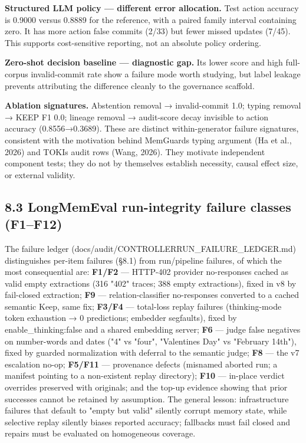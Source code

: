 \textbf{Structured LLM policy --- different error allocation.} Test
action accuracy is 0.9000 versus 0.8889 for the reference, with a paired
family interval containing zero. It has more action false commits (2/33)
but fewer missed updates (7/45). This supports cost-sensitive reporting,
not an absolute policy ordering.

\textbf{Zero-shot decision baseline --- diagnostic gap.} Its lower score
and high full-corpus invalid-commit rate show a failure mode worth
studying, but label leakage prevents attributing the difference cleanly
to the governance scaffold.

\textbf{Ablation signatures.} Abstention removal → invalid-commit 1.0;
typing removal → KEEP F1 0.0; lineage removal → audit-score decay
invisible to action accuracy (0.8556→0.3689). These are distinct
within-generator failure signatures, consistent with the motivation
behind MemGuard\textquotesingle s typing argument (Ha et al., 2026) and
TOKI\textquotesingle s audit rows (Wang, 2026). They motivate
independent component tests; they do not by themselves establish
necessity, causal effect size, or external validity.

\subsection{8.3 LongMemEval run-integrity failure classes
(F1--F12)}\label{longmemeval-run-integrity-failure-classes-f1f12}

The failure ledger (docs/audit/CONTROLLERRUN\_FAILURE\_LEDGER.md)
distinguishes per-item failures (§8.1) from run/pipeline failures, of
which the most consequential are: \textbf{F1/F2} --- HTTP-402 provider
no-responses cached as valid empty extractions (316 "402" traces; 388
empty extractions), fixed in v8 by fail-closed extraction; \textbf{F9}
--- relation-classifier no-responses converted to a cached semantic
Keep, same fix; \textbf{F3/F4} --- total-loss replay failures
(thinking-mode token exhaustion → 0 predictions; embedder segfaults),
fixed by enable\_thinking:false and a shared embedding server;
\textbf{F6} --- judge false negatives on number-words and dates ("4" vs
"four", "Valentine\textquotesingle s Day" vs "February 14th"), fixed by
guarded normalization with deferral to the semantic judge; \textbf{F8}
--- the v7 escalation no-op; \textbf{F5/F11} --- provenance defects
(misnamed aborted run; a manifest pointing to a non-existent replay
directory); \textbf{F10} --- in-place verdict overrides preserved with
originals; and the top-up evidence showing that prior successes cannot
be retained by assumption. The general lesson: infrastructure failures
that default to "empty but valid" silently corrupt memory state, while
selective replay silently biases reported accuracy; fallbacks must fail
closed and repairs must be evaluated on homogeneous coverage.

